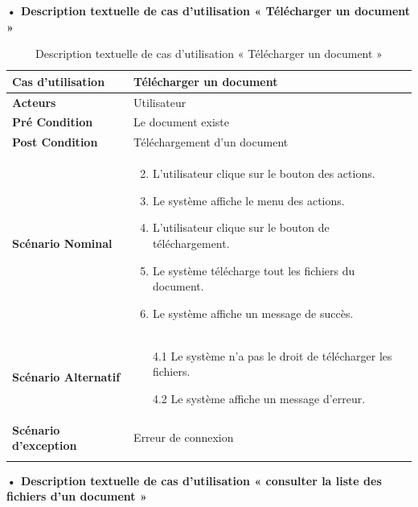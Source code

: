 \textbf{•	Description textuelle de cas d'utilisation « Télécharger un document »}

\begin{longtable}{|p{5cm}|p{10cm}|}
\hline
\textbf{Cas d'utilisation}& Télécharger un document\\
\hline
\textbf{Acteurs}&Utilisateur\\
\hline
\textbf{Pré Condition}&Le document existe\\
\hline
\textbf{Post Condition}&Téléchargement d'un document\\
\hline
\textbf{Scénario Nominal}&
\vspace{-\baselineskip}
\begin{enumerate}
    \setcounter{enumi}{1}
    \item L'utilisateur clique sur le bouton des actions.
    \item Le système affiche le menu des actions.
    \item L'utilisateur clique sur le bouton de téléchargement.
    \item Le système télécharge tout les fichiers du document.
    \item Le système affiche un message de succès.
\end{enumerate}\\
\hline
\textbf{Scénario Alternatif}&
\vspace{-\baselineskip}
\begin{enumerate}
  \item [4.1] Le système n'a pas le droit de télécharger les fichiers.
  \item [4.2] Le système affiche un message d'erreur.
\end{enumerate}\\
\hline
\textbf{Scénario d'exception}&Erreur de connexion\\
\hline
\caption{Description textuelle de cas d'utilisation « Télécharger un document »}
\label{tab:DescriptionTextuelleDeCasDUtilisationTéléchargerUnDocument}
\end{longtable}


\textbf{•	Description textuelle de cas d'utilisation « consulter la liste des fichiers d'un document »}

